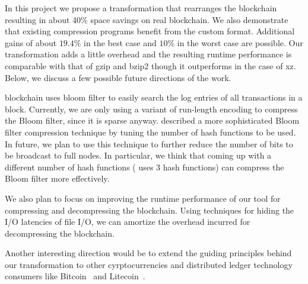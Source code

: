In this project we propose a transformation that rearranges the \eth{} blockchain resulting in about $40\%$ space savings on real blockchain.
We also demonstrate that existing compression programs benefit from the custom format. Additional gains of about $19.4\%$ in the best case and $10\%$ in the worst case are possible.
Our transformation adds a little overhead and 
the resulting runtime performance is comparable with that of gzip and bzip2 though it outperforms in the case of xz.
Below, we discuss a few possible future directions of the work.

\eth{} blockchain uses bloom filter to easily search the log entries of all transactions in a block.
Currently, we are only using a variant of run-length encoding to compress the Bloom filter, since it is sparse anyway. 
\citet{mitzenmacher:2001} described a more sophisticated Bloom filter compression technique by tuning the number of hash functions to be used. 
In future, we plan to use this technique to further reduce the number of bits to be broadcast to full nodes.
In particular, we think that coming up with a different number of hash functions (\eth{} uses 3 hash functions) can compress the Bloom filter more effectively.

We also plan to focus on improving the runtime performance of our tool for compressing and decompressing the blockchain.
Using techniques for hiding the I/O latencies of file I/O, we can amortize 
the overhead incurred for decompressing the blockchain.

Another interesting direction would be to extend the guiding principles behind our transformation to other cyrptocurrencies and distributed ledger technology consumers like Bitcoin~\cite{bitcoin} and Litecoin~\cite{litecoin}.

